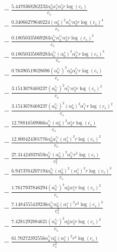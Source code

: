 \documentclass[10pt]{article}
\begin{document}
\begin{align*}
&{}  - \frac{5.4470368262232 \alpha_{0}^s \alpha_{1}^s \alpha_{3}^s r \log{\left(c_{s} \right)}}{c_{s}} \\
&{}  - \frac{0.34066279640224 \left(\alpha_{0}^s\right)^{2} \alpha_{1}^{c_s} \alpha_{2}^s r \log{\left(c_{s} \right)}^{4}}{c_{s}} \\
&{}  - \frac{0.18050335069283 \alpha_{0}^{c_s} \alpha_{2}^{c_s} \alpha_{2}^s r \log{\left(c_{s} \right)}^{3}}{c_{s}} \\
&{}  - \frac{0.18050335069283 \alpha_{0}^{c_s} \left(\alpha_{0}^s\right)^{3} \alpha_{2}^{c_s} r \log{\left(c_{s} \right)}^{3}}{c_{s}} \\
&{}  - \frac{0.76390519028696 \left(\alpha_{0}^{c_s}\right)^{3} \alpha_{0}^s \alpha_{2}^{c_s} r \log{\left(c_{s} \right)}}{c_{s}} \\
&{}  - \frac{3.1513678468237 \left(\alpha_{0}^{c_s}\right)^{2} \alpha_{1}^{c_s} \alpha_{2}^s r \log{\left(c_{s} \right)}^{2}}{c_{s}} \\
&{}  - \frac{3.1513678468237 \left(\alpha_{0}^{c_s}\right)^{2} \left(\alpha_{0}^s\right)^{3} \alpha_{1}^{c_s} r \log{\left(c_{s} \right)}^{2}}{c_{s}} \\
&{}  - \frac{12.78816589066 \alpha_{0}^{c_s} \left(\alpha_{0}^s\right)^{3} \alpha_{2}^s r \log{\left(c_{s} \right)}}{c_{s}} \\
&{}  - \frac{12.800424301776 \alpha_{0}^s \alpha_{1}^{c_s} \left(\alpha_{1}^s\right)^{2} r \log{\left(c_{s} \right)}^{2}}{c_{s}} \\
&{}  - \frac{27.31424937659 \alpha_{0}^{c_s} \left(\alpha_{0}^s\right)^{2} \alpha_{2}^{c_s} r^{2} \log{\left(c_{s} \right)}}{c_{s}^{2}} \\
&{}  - \frac{6.9473764207194 \alpha_{0}^{c_s} \left(\alpha_{0}^s\right)^{2} \left(\alpha_{1}^s\right)^{2} r \log{\left(c_{s} \right)}^{3}}{c_{s}} \\
&{}  - \frac{1.7617937846294 \left(\alpha_{0}^{c_s}\right)^{4} \alpha_{0}^s \alpha_{1}^s r \log{\left(c_{s} \right)}^{2}}{c_{s}} \\
&{}  - \frac{7.1484555439236 \alpha_{0}^{c_s} \alpha_{0}^s \left(\alpha_{1}^s\right)^{2} r^{2} \log{\left(c_{s} \right)}^{3}}{c_{s}^{2}} \\
&{}  - \frac{7.4281292884621 \left(\alpha_{0}^{c_s}\right)^{2} \alpha_{0}^s \alpha_{3}^s r \log{\left(c_{s} \right)}^{2}}{c_{s}} \\
&{}  - \frac{61.70272392556 \alpha_{0}^{c_s} \alpha_{0}^s \left(\alpha_{1}^s\right)^{2} r^{2} \log{\left(c_{s} \right)}}{c_{s}^{2}} \\

\end{align*}
\end{document}
